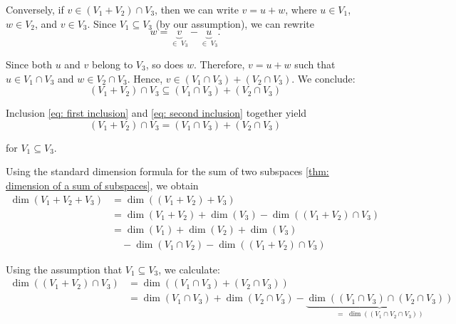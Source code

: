 \begin{xrcs}
\begin{xsol}
\begin{xprf}
      Conversely, if $v \in (V_1 + V_2) \cap V_3$, then we can write $v = u + w$, where $u \in V_1$, $w \in V_2$, and $v \in V_3$. Since $V_1 \subseteq V_3$ (by our assumption), we can rewrite
      \begin{equation}
        w = \underbrace{v}_{\in \; V_3}-\underbrace{u}_{\in \; V_3}.
      \end{equation}

      Since both $u$ and $v$ belong to $V_3$, so does $w$. Therefore, $v=u+w$ such that $u \in V_1 \cap V_3$ and $w \in V_2 \cap V_3$. Hence, $v \in (V_1 \cap V_3) + (V_2 \cap V_3)$. We conclude:
      \begin{equation}
        \label{eq: second inclusion}
        (V_1 + V_2) \cap V_3 \subseteq (V_1 \cap V_3) + (V_2 \cap V_3)
      \end{equation}

      Inclusion \eqref{eq: first inclusion} and \eqref{eq: second inclusion} together yield
      \begin{equation}
        (V_1 + V_2) \cap V_3 = (V_1 \cap V_3) + (V_2 \cap V_3)
      \end{equation}

      for $V_1 \subseteq V_3$.
    \end{xprf}

    Using the standard dimension formula  for the sum of two subspaces \ref{thm: dimension of a sum of subspaces}, we obtain
    \begin{equation}
      \label{eq: first forumla}
      \begin{aligned}
        \dim (V_1 + V_2 + V_3) &= \dim ((V_1+V_2) + V_3) \\
          &= \dim (V_1 + V_2) + \dim (V_3) - \dim((V_1 +V_2) \cap V_3) \\
          &= \dim (V_1) + \dim (V_2) + \dim (V_3) \\
          & \quad - \dim (V_1 \cap V_2) - \dim ((V_1 + V_2) \cap V_3)
      \end{aligned}
    \end{equation}

    Using the assumption that $V_1 \subseteq V_3$, we calculate:
    \begin{equation}
      \begin{aligned}
        \dim ((V_1 + V_2) \cap V_3)
        &= \dim ((V_1 \cap V_3) + (V_2 \cap V_3)) \\
        &= \dim (V_1 \cap V_3) + \dim (V_2 \cap V_3) - \underbrace{\dim ((V_1 \cap V_3) \cap (V_2\cap V_3))}_{= \; \dim ((V_1 \cap V_2 \cap V_3))}
      \end{aligned}
    \end{equation}


\end{xsol}
\end{xrcs}
